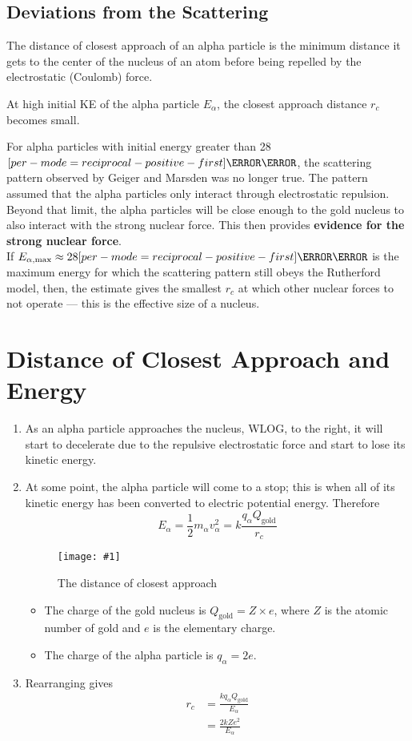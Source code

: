\documentclass[a4paper,12pt]{article}
\let\oldsection\section
\renewcommand\section{\clearpage\oldsection}
\let\oldsi\si
\renewcommand{\si}[1]{\oldsi[per-mode=reciprocal-positive-first]{#1}}
\newcommand{\lb}{\\[8pt]}
\newcommand{\img}[4]{\begin{center}
  \begin{figure}[H]
    \centering
    \texttt{[image: \#1]}
    \caption{#3}
    \label{fig:#4}
  \end{figure}
\end{center}}
\begin{document}
\subsection{Deviations from the Scattering}

\begin{defin}
  The distance of closest approach of an alpha particle is the minimum distance it gets to the center of the nucleus of an atom before being repelled by the electrostatic (Coulomb) force.

  At high initial KE of the alpha particle $E_\alpha$, the closest approach distance $r_c$ becomes small.
\end{defin}

For alpha particles with initial energy greater than 28 $\si{\mega\eV}$, the scattering pattern observed by Geiger and Marsden was no longer true. The pattern assumed that the alpha particles only interact through electrostatic repulsion. Beyond that limit, the alpha particles will be close enough to the gold nucleus to also interact with the strong nuclear force. This then provides \textbf{evidence for the strong nuclear force}.\lb

If $E_{\alpha, \max} \approx 28\si{\mega\eV}$ is the maximum energy for which the scattering pattern still obeys the Rutherford model, then, the estimate gives the smallest $r_c$ at which other nuclear forces to not operate --- this is the effective size of a nucleus.

\section{Distance of Closest Approach and Energy}

\begin{enumerate}
  \item As an alpha particle approaches the nucleus, WLOG, to the right, it will start to decelerate due to the repulsive electrostatic force and start to lose its kinetic energy.
  \item At some point, the alpha particle will come to a stop; this is when all of its kinetic energy has been converted to electric potential energy. Therefore
        $$E_\alpha = \frac{1}{2}m_\alpha v_\alpha^2 = k\frac{q_\alpha Q_\text{gold}}{r_c}$$
        \img{doca.png}{0.9}{The distance of closest approach}{doca}
        \begin{itemize}
          \item The charge of the gold nucleus is $Q_\text{gold} = Z\times e$, where $Z$ is the atomic number of gold and $e$ is the elementary charge.
          \item The charge of the alpha particle is $q_\alpha = 2e$.
        \end{itemize}
  \item Rearranging gives
        \begin{align*}
          r_c & = \frac{kq_\alpha Q_\text{gold}}{E_\alpha} \\
              & = \frac{2kZe^2}{E_\alpha}
        \end{align*}
\end{enumerate}
\end{document}
